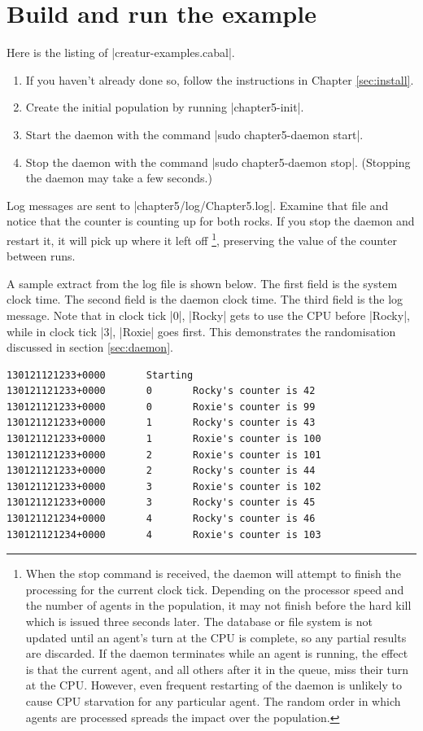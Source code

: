 \documentclass[a4paper,10pt]{report}
\begin{document}


\section{Build and run the example}
\label{sec:run1}


Here is the listing of |creatur-examples.cabal|.


\begin{enumerate}
\item If you haven't already done so, follow the instructions in Chapter
\ref{sec:install}.
\item Create the initial population by running |chapter5-init|.
\item Start the daemon with the command |sudo chapter5-daemon start|.
\item Stop the daemon with the command |sudo chapter5-daemon stop|.
(Stopping the daemon may take a few seconds.)
\end{enumerate}

Log messages are sent to |chapter5/log/Chapter5.log|.
Examine that file and notice that the counter is counting up for both rocks.
If you stop the daemon and restart it, it will pick up where it left off
\footnote{When the stop command is received, the daemon will attempt
to finish the processing for the current clock tick.
Depending on the processor speed and the number of agents in the population,
it may not finish before the hard kill which is issued three seconds later.
The database or file system is not updated until an agent's turn at the CPU 
is complete, so any partial results are discarded.
If the daemon terminates while an agent is running,
the effect is that the current agent, and all others after it in the queue,
miss their turn at the CPU.
However, even frequent restarting of the daemon
is unlikely to cause CPU starvation for any particular agent.
The random order in which agents are processed spreads the impact
over the population.}, preserving the value of the 
counter between runs.

A sample extract from the log file is shown below.
The first field is the system clock time.
The second field is the daemon clock time.
The third field is the log message.
Note that in clock tick |0|, |Rocky| gets to use the CPU before |Rocky|,
while in clock tick |3|, |Roxie| goes first.
This demonstrates the randomisation discussed in section \ref{sec:daemon}.

\begin{verbatim}
130121121233+0000       Starting
130121121233+0000       0       Rocky's counter is 42
130121121233+0000       0       Roxie's counter is 99
130121121233+0000       1       Rocky's counter is 43
130121121233+0000       1       Roxie's counter is 100
130121121233+0000       2       Roxie's counter is 101
130121121233+0000       2       Rocky's counter is 44
130121121233+0000       3       Roxie's counter is 102
130121121233+0000       3       Rocky's counter is 45
130121121234+0000       4       Rocky's counter is 46
130121121234+0000       4       Roxie's counter is 103
\end{verbatim}
\end{document}
